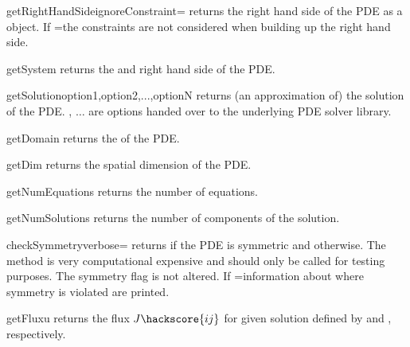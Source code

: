 \begin{methoddesc}[LinearPDE]{getRightHandSide}{ignoreConstraint=\False}
returns the right hand side of the PDE as a \Data object. If
=\True the constraints are not considered
when building up the right hand side.
\end{methoddesc}

\begin{methoddesc}[LinearPDE]{getSystem}{}
returns the \Operator and right hand side of the PDE.
\end{methoddesc}

\begin{methoddesc}[LinearPDE]{getSolution}{option1,option2,...,optionN}
returns (an approximation of) the solution of the PDE. ,   
$\ldots$  are options handed over to the underlying PDE solver library.  
\end{methoddesc}

\begin{methoddesc}[LinearPDE]{getDomain}{}
returns the \Domain of the PDE.
\end{methoddesc}

\begin{methoddesc}[LinearPDE]{getDim}{}
returns the spatial dimension of the PDE.
\end{methoddesc}

\begin{methoddesc}[LinearPDE]{getNumEquations}{}
returns the number of equations.
\end{methoddesc}

\begin{methoddesc}[LinearPDE]{getNumSolutions}{}
returns the number of components of the solution.
\end{methoddesc}

\begin{methoddesc}[LinearPDE]{checkSymmetry}{verbose=\False}
returns \True if the PDE is symmetric and \False otherwise. 
The method is very computational expensive and should only be 
called for testing purposes. The symmetry flag is not altered.
If =\True information about where symmetry is violated
are printed.
\end{methoddesc}

\begin{methoddesc}[LinearPDE]{getFlux}{u}
returns the flux $J\hackscore{ij}$  for given solution 
defined by  and , respectively.
\end{methoddesc}

